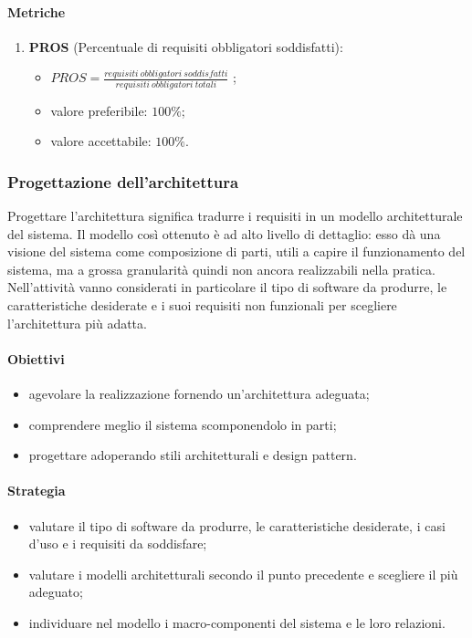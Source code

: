         \paragraph{Metriche}
            \begin{enumerate}
                \item \textbf{PROS} (Percentuale di requisiti obbligatori soddisfatti):
                \begin{itemize}
                    \item $PROS = \frac{requisiti\ obbligatori\ soddisfatti}{requisiti\ obbligatori\ totali}$ ;
                    \item valore preferibile: $100\%$;
                    \item valore accettabile: $100\%$.
                \end{itemize}
            \end{enumerate}
    \subsubsection{Progettazione dell'architettura}
        Progettare l'architettura significa tradurre i requisiti in un modello architetturale del sistema.
        Il modello così ottenuto è ad alto livello di dettaglio: esso dà una visione del sistema come composizione di parti, utili a capire il funzionamento del sistema, ma a grossa granularità quindi non ancora realizzabili nella pratica.\newline
        Nell'attività vanno considerati in particolare il tipo di software da produrre, le caratteristiche desiderate e i suoi requisiti non funzionali per scegliere l'architettura più adatta.
        \paragraph{Obiettivi}
            \begin{itemize}
                \item agevolare la realizzazione fornendo un'architettura adeguata;
                \item comprendere meglio il sistema scomponendolo in parti;
                \item progettare adoperando stili architetturali e design pattern.
            \end{itemize}
        \paragraph{Strategia}
            \begin{itemize}
                \item valutare il tipo di software da produrre, le caratteristiche desiderate, i casi d'uso e i requisiti da soddisfare;
                \item valutare i modelli architetturali secondo il punto precedente e scegliere il più adeguato;
                \item individuare nel modello i macro-componenti del sistema e le loro relazioni.
            \end{itemize}
